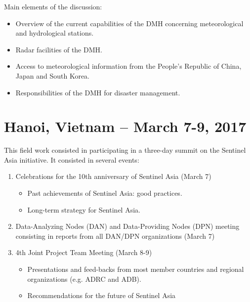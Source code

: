 Main elements of the discussion:

\begin{itemize}

\item Overview of the current capabilities of the DMH concerning meteorological and hydrological stations.

\item Radar facilities of the DMH.

\item Access to meteorological information from the People's Republic of China, Japan and South Korea.

\item Responsibilities of the DMH for disaster management.

\end{itemize}


\section{Hanoi, Vietnam -- March 7-9, 2017}

\tab This field work consisted in participating in a three-day summit on the Sentinel Asia initiative. It consisted in several events:

\begin{enumerate}

\item Celebrations for the 10th anniversary of Sentinel Asia (March 7)

	\begin{itemize}
	\item Past achievements of Sentinel Asia: good practices.
	\item Long-term strategy for Sentinel Asia.
	\end{itemize}

\item Data-Analyzing Nodes (DAN) and Data-Providing Nodes (DPN) meeting consisting in reports from all DAN/DPN organizations (March 7)

\item 4th Joint Project Team Meeting (March 8-9)

	\begin{itemize}
	\item Presentations and feed-backs from most member countries and regional organizations (e.g. ADRC and ADB).
	\item Recommendations for the future of Sentinel Asia
	\end{itemize}

\end{enumerate}


